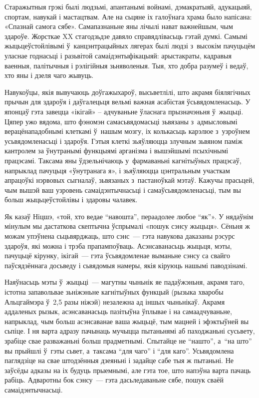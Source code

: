 Старажытныя грэкі былі людзьмі, апантанымі войнамі, дэмакратыяй, адукацыяй, спортам, навукай і мастацтвам. Але на сьцяне іх галоўнага храма было напісана: «Спазнай самога сябе». Самапазнаньне яны лічылі нават важнейшым, чым здароўе. Жорсткае XX стагодзьдзе давяло справядлівасьць гэтай думкі. Самымі жыцьцеўстойлівымі ў~канцэнтрацыйных лягерах былі людзі з~высокім пачуцьцём уласнае годнасьці і разьвітой самаідэнтыфікацыяй: арыстакраты, кадравыя ваенныя, палітычныя і рэлігійныя зьняволеныя. Тыя, хто добра разумеў і ведаў, хто яны і дзеля чаго жывуць.

Навукоўцы, якія вывучаюць доўгажыхароў, высьветлілі, што акрамя біялягічных прычын для здароўя і даўгалецьця вельмі важная асабістая ўсьвядомленасьць. У японцаў гэта завецца «ікігай» -- адчуваньне ўласнага прызначэньня ў~жыцьці. Цяпер ужо вядома, што фэномэн самасьвядомасьці зьвязаны з~адмысловымі верацёнападобнымі клеткамі ў~нашым мозгу, іх колькасьць карэлюе з~узроўнем усьвядомленасьці і здароўя. Гэтыя клеткі зьяўляюцца злучным зьвяном паміж кантролем за ўнутранымі функцыямі арганізма і вышэйшымі псыхічнымі працэсамі. Таксама яны ўдзельнічаюць у~фармаваньні кагнітыўных працэсаў, напрыклад пачуцьця «ўнутранага я», і зьяўляюцца цэнтральным участкам апрацоўкі нэрвовых сыгналаў, зьвязаных з~пастаноўкай мэтаў. Кажучы прасьцей, чым вышэй ваш узровень самаідэнтычнасьці і самаўсьвядомленасьці, тым вы больш жыцьцеўстойлівы і здаровы чалавек.

Як казаў Ніцшэ, «той, хто ведае ``навошта'', пераадолее любое ``як''». У нядаўнім мінулым мы дастаткова скептычна ўспрымалі «пошук сэнсу жыцьця». Сёньня ж можам упэўнена сьцьвярджаць, што сэнс~--- гэта навукова даказаны рэсурс здароўя, які можна і трэба прапампоўваць. Асэнсаванасьць жыцьця, мэты, пачуцьцё кірунку, ікігай~--- гэта ўсьвядомленае выманьне сэнсу са свайго паўсядзённага досьведу і сьвядомыя намеры, якія кіруюць нашымі паводзінамі.

Наяўнасьць мэты ў~жыцьці~--- магутны чыньнік яе падаўжэньня, акрамя таго, істотна запавольвае зьніжэньне кагнітыўных функцый (рызыка хваробы Альцгаймэра ў~2,5 разы ніжэй) незалежна ад іншых чыньнікаў. Акрамя аддаленых рызык, асэнсаванасьць пазітыўна ўплывае і на самаадчуваньне, напрыклад, чым больш асэнсаванае ваша жыцьцё, тым мацней і эфэктыўней вы сьпіце. І ня варта адразу пачынаць мучыцца пытаньнямі аб паходжаньні сусьвету, зрабіце свае разважаньні больш прадметнымі. Спытайце не ``нашто'', а~``на што'' вы прыйшлі ў~гэты сьвет, а~таксама ``для чаго'' і ``для каго''. Усьвядомлена паглядзіце на свае штодзённыя дзеяньні і задайце сабе тыя ж пытаньні. Не заўсёды адказы на іх будуць прыемнымі, але гэта тое, што напэўна варта пачаць рабіць. Адваротны бок сэнсу~--- гэта дасьледаваньне сябе, пошук сваёй самаідэнтычнасьці.


